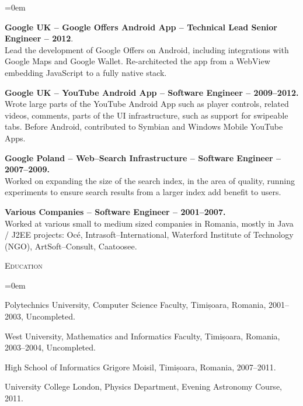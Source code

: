 \documentclass[11pt]{article}
\begin{document}
\begin{list}{}{\leftmargin=0em}
\item
{\bf Google UK -- Google Offers Android App -- Technical Lead Senior Engineer -- 2012}.\\
Lead the development of Google Offers on Android, including integrations with Google Maps and Google Wallet.
Re-architected the app from a WebView embedding JavaScript to a fully native stack.

\item
{\bf Google UK -- YouTube Android App -- Software Engineer -- 2009--2012.}\\
Wrote large parts of the YouTube Android App such as player controls, related videos, comments, parts of the UI 
infrastructure, such as support for swipeable tabs.
Before Android, contributed to Symbian and Windows Mobile YouTube Apps.

\item
{\bf Google Poland -- Web--Search Infrastructure -- Software Engineer -- 2007--2009.}\\
Worked on expanding the size of the search index, in the area of quality, running experiments to ensure
search results from a larger index add benefit to users.


\item
{\bf Various Companies -- Software Engineer -- 2001--2007.}\\
Worked at various small to medium sized companies in Romania, mostly in Java / J2EE projects:
Oc\'e, Intrasoft--International, Waterford Institute of Technology (NGO), ArtSoft--Consult, Caatoosee.

\end{list}

\vspace{0.12in}

\noindent
\textcolor{Primary}{{\large \textsc{Education}}}
\begin{list}{}{\leftmargin=0em}
  \setlength{\itemsep}{1pt}
  \setlength{\parskip}{0pt}
  \setlength{\parsep}{0pt}
  \item Polytechnics University, Computer Science Faculty, Timișoara, Romania, 2001--2003, Uncompleted.
  \item West University, Mathematics and Informatics Faculty, Timișoara, Romania, 2003--2004, Uncompleted.
  \item High School of Informatics Grigore Moisil, Timișoara, Romania, 2007--2011.
  \item University College London, Physics Department, Evening Astronomy Course, 2011.
\end{list}
\end{document}
